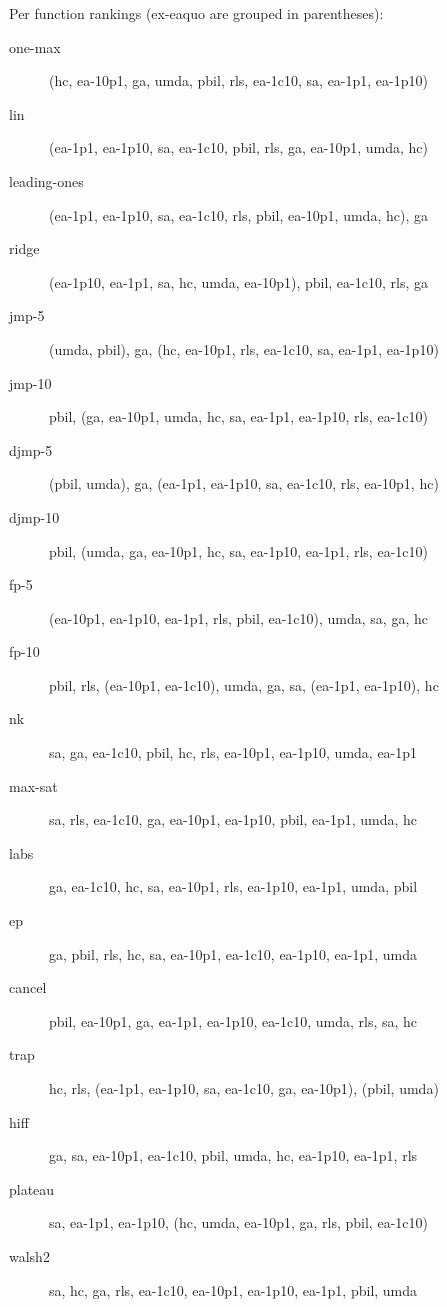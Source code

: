 Per function rankings (ex-eaquo are grouped in parentheses):
\begin{description}
\item[one-max]
(hc, ea-10p1, ga, umda, pbil, rls, ea-1c10, sa, ea-1p1, ea-1p10)

\item[lin]
(ea-1p1, ea-1p10, sa, ea-1c10, pbil, rls, ga, ea-10p1, umda, hc)

\item[leading-ones]
(ea-1p1, ea-1p10, sa, ea-1c10, rls, pbil, ea-10p1, umda, hc), ga

\item[ridge]
(ea-1p10, ea-1p1, sa, hc, umda, ea-10p1), pbil, ea-1c10, rls, ga

\item[jmp-5]
(umda, pbil), ga, (hc, ea-10p1, rls, ea-1c10, sa, ea-1p1, ea-1p10)

\item[jmp-10]
pbil, (ga, ea-10p1, umda, hc, sa, ea-1p1, ea-1p10, rls, ea-1c10)

\item[djmp-5]
(pbil, umda), ga, (ea-1p1, ea-1p10, sa, ea-1c10, rls, ea-10p1, hc)

\item[djmp-10]
pbil, (umda, ga, ea-10p1, hc, sa, ea-1p10, ea-1p1, rls, ea-1c10)

\item[fp-5]
(ea-10p1, ea-1p10, ea-1p1, rls, pbil, ea-1c10), umda, sa, ga, hc

\item[fp-10]
pbil, rls, (ea-10p1, ea-1c10), umda, ga, sa, (ea-1p1, ea-1p10), hc

\item[nk]
sa, ga, ea-1c10, pbil, hc, rls, ea-10p1, ea-1p10, umda, ea-1p1

\item[max-sat]
sa, rls, ea-1c10, ga, ea-10p1, ea-1p10, pbil, ea-1p1, umda, hc

\item[labs]
ga, ea-1c10, hc, sa, ea-10p1, rls, ea-1p10, ea-1p1, umda, pbil

\item[ep]
ga, pbil, rls, hc, sa, ea-10p1, ea-1c10, ea-1p10, ea-1p1, umda

\item[cancel]
pbil, ea-10p1, ga, ea-1p1, ea-1p10, ea-1c10, umda, rls, sa, hc

\item[trap]
hc, rls, (ea-1p1, ea-1p10, sa, ea-1c10, ga, ea-10p1), (pbil, umda)

\item[hiff]
ga, sa, ea-10p1, ea-1c10, pbil, umda, hc, ea-1p10, ea-1p1, rls

\item[plateau]
sa, ea-1p1, ea-1p10, (hc, umda, ea-10p1, ga, rls, pbil, ea-1c10)

\item[walsh2]
sa, hc, ga, rls, ea-1c10, ea-10p1, ea-1p10, ea-1p1, pbil, umda

\end{description}
